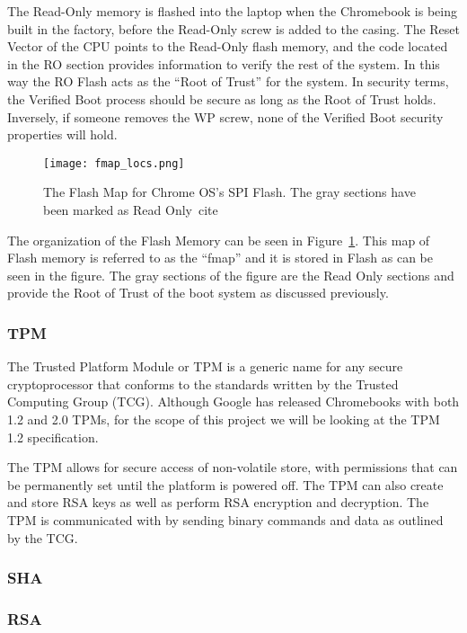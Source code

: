 \documentclass[../report.tex]{subfiles}
\begin{document}
The Read-Only memory is flashed into the laptop when the Chromebook is being built in the factory, before the Read-Only screw is added to the casing. 
The Reset Vector of the CPU points to the Read-Only flash memory, and the code located in the RO section provides information to verify the rest of the system.
In this way the RO Flash acts as the ``Root of Trust'' for the system.
In security terms, the Verified Boot process should be secure as long as the Root of Trust holds.
Inversely, if someone removes the WP screw, none of the Verified Boot security properties will hold.

\begin{figure}
  \centering
  \texttt{[image: fmap\_locs.png]}
  \caption{The Flash Map for Chrome OS's SPI Flash. The gray sections have been marked as Read Only~cite\cite{fw-summit}}
  \label{fig:fmap}
\end{figure}

The organization of the Flash Memory can be seen in Figure~\ref{fig:fmap}.
This map of Flash memory is referred to as the ``fmap'' and it is stored in Flash as can be seen in the figure.
The gray sections of the figure are the Read Only sections and provide the Root of Trust of the boot system as discussed previously.

\subsubsection{TPM}

The Trusted Platform Module or TPM is a generic name for any secure cryptoprocessor that conforms to the standards written by the Trusted Computing Group (TCG). %
Although Google has released Chromebooks with both 1.2 and 2.0 TPMs, for the scope of this project we will be looking at the TPM 1.2 specification.

The TPM allows for secure access of non-volatile store, with permissions that can be permanently set until the platform is powered off.
The TPM can also create and store RSA keys as well as perform RSA encryption and decryption. 
The TPM is communicated with by sending binary commands and data as outlined by the TCG. %



\subsubsection{SHA}
\subsubsection{RSA}
\end{document}
